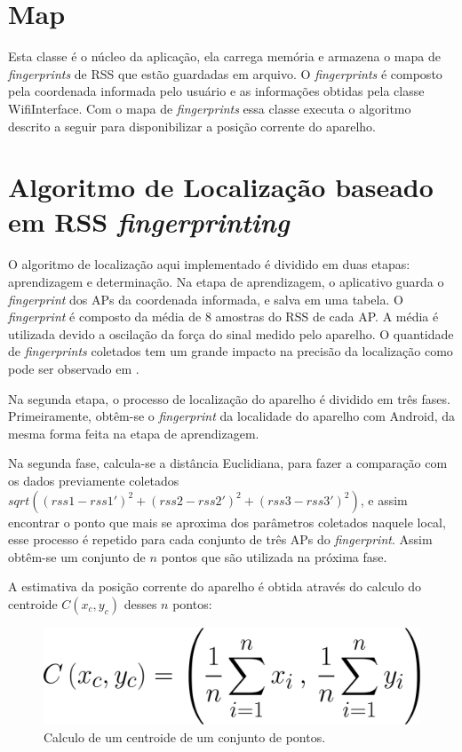   \section{Map}
  Esta classe é o núcleo da aplicação, ela carrega memória e armazena o mapa de \textit{fingerprints} de RSS que estão 
  guardadas em arquivo. 
  O \textit{fingerprints} é composto 
  pela coordenada informada pelo usuário e as informações obtidas pela classe WifiInterface. 
  Com o mapa de \textit{fingerprints} essa classe executa o algoritmo descrito a seguir para disponibilizar 
  a posição corrente do aparelho.
   
  \section{Algoritmo de Localização baseado em RSS \textit{fingerprinting}}
  
  O algoritmo de localização aqui implementado é dividido em duas etapas: aprendizagem e determinação. Na etapa de aprendizagem, 
  o aplicativo guarda o \textit{fingerprint} dos APs da coordenada informada,
  e salva em uma tabela. O \textit{fingerprint} é composto da média de 8 amostras do RSS de cada AP. A média é utilizada 
  devido a oscilação da força do sinal medido pelo aparelho. O quantidade de \textit{fingerprints} coletados tem um grande 
  impacto na precisão da localização como pode ser observado em \cite{wifiRadar}.  
  
  Na segunda etapa, o processo de localização do aparelho é dividido em três fases. 
  Primeiramente, obtêm-se o \textit{fingerprint} da localidade
  do aparelho com Android, da mesma forma feita na etapa de aprendizagem. 
    
  Na segunda fase, calcula-se a distância Euclidiana, para fazer a comparação com os 
  dados previamente coletados $sqrt((rss1-rss1')^{2}+(rss2-rss2')^{2}+(rss3-rss3')^{2})$, 
e assim encontrar o ponto que mais se aproxima dos parâmetros coletados naquele local, 
 esse processo é repetido para cada conjunto de três APs do \textit{fingerprint}. 
 Assim obtêm-se um conjunto de $n$ pontos que são utilizada na próxima fase. 
  
  A estimativa da posição corrente do aparelho é obtida através do calculo do centroide $C(x_c,y_c)$ desses $n$ pontos:
  \begin{figure}[hbt]
  \centering
  \includegraphics[scale=0.23]{images/centroid.png}
  \caption{Calculo de um centroide de um conjunto de pontos.}
  \label{fig:centroidFormula}
  \end{figure}
  
